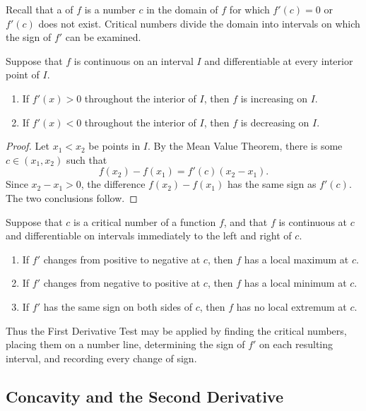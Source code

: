 Recall that a  of \(f\) is a number \(c\) in the
domain of \(f\) for which \(f'(c)=0\) or \(f'(c)\) does not exist.  Critical
numbers divide the domain into intervals on which the sign of \(f'\) can be
examined.

\begin{theorem}
    Suppose that \(f\) is continuous on an interval \(I\) and differentiable
    at every interior point of \(I\).
    \begin{enumerate}
        \item If \(f'(x)>0\) throughout the interior of \(I\), then \(f\) is
        increasing on \(I\).
        \item If \(f'(x)<0\) throughout the interior of \(I\), then \(f\) is
        decreasing on \(I\).
    \end{enumerate}
\end{theorem}
\begin{proof}
    Let \(x_1<x_2\) be points in \(I\).  By the Mean Value Theorem, there is
    some \(c\in(x_1,x_2)\) such that
    \[
        f(x_2)-f(x_1)=f'(c)(x_2-x_1).
    \]
    Since \(x_2-x_1>0\), the difference \(f(x_2)-f(x_1)\) has the same sign
    as \(f'(c)\).  The two conclusions follow.
\end{proof}

\begin{theorem}
    Suppose that \(c\) is a critical number of a function \(f\), and that
    \(f\) is continuous at \(c\) and differentiable on intervals immediately
    to the left and right of \(c\).
    \begin{enumerate}
        \item If \(f'\) changes from positive to negative at \(c\), then
        \(f\) has a local maximum at \(c\).
        \item If \(f'\) changes from negative to positive at \(c\), then
        \(f\) has a local minimum at \(c\).
        \item If \(f'\) has the same sign on both sides of \(c\), then
        \(f\) has no local extremum at \(c\).
    \end{enumerate}
\end{theorem}

Thus the First Derivative Test may be applied by finding the critical
numbers, placing them on a number line, determining the sign of \(f'\) on
each resulting interval, and recording every change of sign.

\subsection{Concavity and the Second Derivative}


